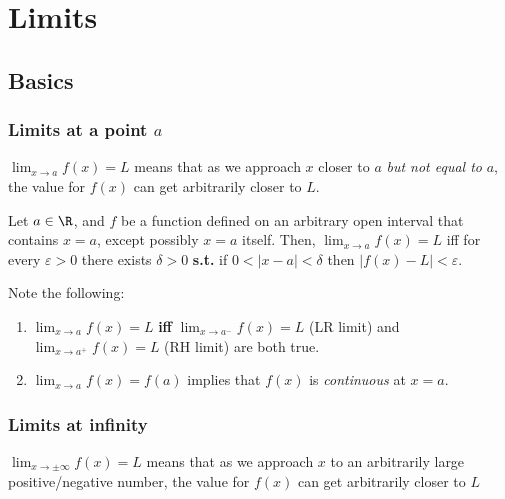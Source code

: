 \documentclass[main.tex]{subfiles}
\begin{document}
\section{Limits}
	\subsection*{Basics}
	\subsubsection*{Limits at a point \(a\)}
	\begin{definition}[informal]
		\(\lim_{x \to a}{f(x)} = L\) means that as we approach \(x\) closer to \(a\) \emph{but not equal to} \(a\), 
		the value for \(f(x)\) can get arbitrarily closer to \(L\).
	\end{definition} 

	\begin{definition}[formal]
		Let \(a \in \R\), and \(f\) be a function defined on an arbitrary open interval that contains \(x = a\), except possibly \(x = a\) itself.
		Then, \(\lim_{x \to a}{f(x)} = L\) iff for every \(\varepsilon > 0\) there exists \(\delta > 0\) \textbf{s.t.} if \(0 < |x - a| < \delta\) then \( |f(x) - L| < \varepsilon\).
	\end{definition}

	Note the following:
	\begin{enumerate}
	\item \(\lim_{x \to a}{f(x)} = L\) \textbf{iff} \(\lim_{x \to a^{-}}{f(x)} = L\) (LR limit) 
	and \(\lim_{x \to a^{+}}{f(x)} = L\) (RH limit) are both true.
	\item \(\lim_{x \to a}{f(x)} = f(a)\) implies that \(f(x)\) is \emph{continuous} at \(x = a\).
	\end{enumerate}

	\subsubsection*{Limits at infinity}
	\begin{definition}[informal]
		\(\lim_{x \to \pm \infty}{f(x)} = L\) means that as we approach \(x\) to an arbitrarily large positive/negative number, the value for \(f(x)\) can get arbitrarily closer to \(L\)
	\end{definition}
\end{document}

